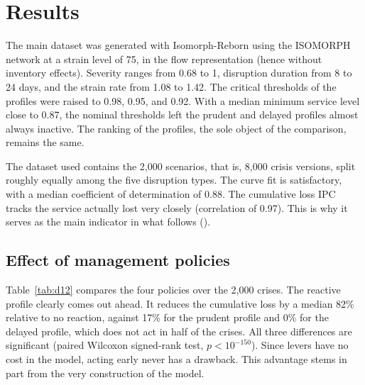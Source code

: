 \section{Results}
\label{sec:4}

\label{sec:4.1}

The main dataset was generated with Isomorph-Reborn using the ISOMORPH network at a strain level of 75, in the flow representation (hence without inventory effects). Severity ranges from 0.68 to 1, disruption duration from 8 to 24 days, and the strain rate from 1.08 to 1.42. The critical thresholds of the profiles were raised to 0.98, 0.95, and 0.92. With a median minimum service level close to 0.87, the nominal thresholds left the prudent and delayed profiles almost always inactive. The ranking of the profiles, the sole object of the comparison, remains the same.

The dataset used contains the 2,000 scenarios, that is, 8,000 crisis versions, split roughly equally among the five disruption types. The curve fit is satisfactory, with a median coefficient of determination of 0.88. The cumulative loss IPC tracks the service actually lost very closely (correlation of 0.97). This is why it serves as the main indicator in what follows ().

\subsection{Effect of management policies}
\label{sec:4.2}

Table~\ref{tab:d12} compares the four policies over the 2,000 crises. The reactive profile clearly comes out ahead. It reduces the cumulative loss by a median 82\% relative to no reaction, against 17\% for the prudent profile and 0\% for the delayed profile, which does not act in half of the crises. All three differences are significant (paired Wilcoxon signed-rank test, $p < 10^{-150}$). Since levers have no cost in the model, acting early never has a drawback. This advantage stems in part from the very construction of the model.


